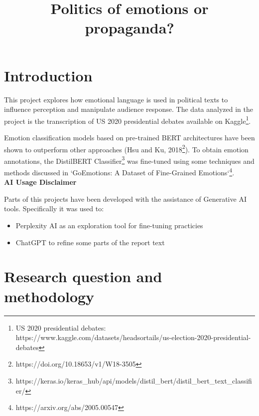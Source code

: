 \documentclass[pdflatex,sn-mathphys-num]{sn-jnl}%
\begin{document}
\title[Article Title]{Politics of emotions or propaganda?}

\author{ }



\maketitle

\section{Introduction}\label{sec1}

This project explores how emotional language is used in political texts to influence perception and manipulate audience response. The data analyzed in the project is the transcription of US 2020 presidential debates available on Kaggle\footnote{US 2020 presidential debates: \\ https://www.kaggle.com/datasets/headsortails/us-election-2020-presidential-debates}. 

Emotion classification models based on pre-trained BERT architectures have been shown to outperform other approaches (Hsu and Ku, 2018\footnote{https://doi.org/10.18653/v1/W18-3505}). To obtain emotion annotations, the DistilBERT Classifier\footnote{https://keras.io/keras_hub/api/models/distil_bert/distil_bert_text_classifier/} was fine-tuned using some techniques and methods discussed in `GoEmotions: A Dataset of Fine-Grained Emotions`\footnote{https://arxiv.org/abs/2005.00547}.\\ 

\textbf{AI Usage Disclaimer}

Parts of this projects have been developed with the assistance of Generative AI tools. Specifically it was used to:
\begin{itemize}
	\item Perplexity AI as an exploration tool for fine-tuning practicies
	\item ChatGPT to refine some parts of the report text
\end{itemize}


\section{Research question and methodology}\label{sec2}
\end{document}
